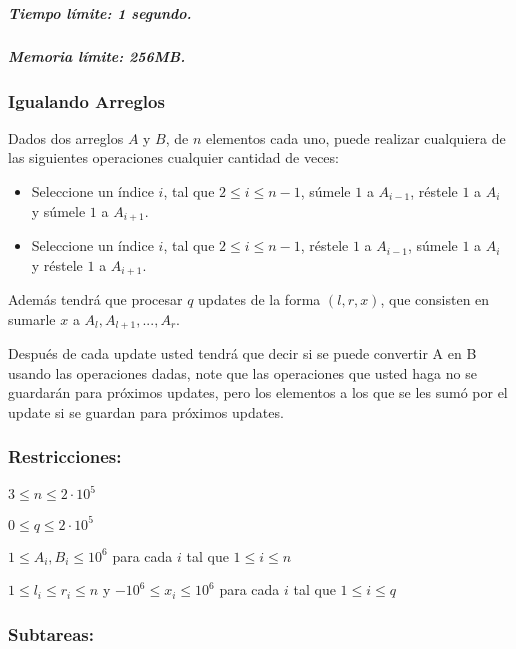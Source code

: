 \hypertarget{tiempo-luxedmite-1-segundo.}{%
\subparagraph{Tiempo límite: 1
segundo.}\label{tiempo-luxedmite-1-segundo.}}

\hypertarget{memoria-luxedmite-256mb.}{%
\subparagraph{Memoria límite: 256MB.}\label{memoria-luxedmite-256mb.}}

\hypertarget{igualando-arreglos}{%
\subsubsection{Igualando Arreglos}\label{igualando-arreglos}}

Dados dos arreglos \(A\) y \(B\), de \(n\) elementos cada uno, puede
realizar cualquiera de las siguientes operaciones cualquier cantidad de
veces:

\begin{itemize}
\item
  Seleccione un índice \(i\), tal que \(2 \leq i \leq n-1\), súmele
  \(1\) a \(A_{i-1}\), réstele \(1\) a \(A_{i}\) y súmele \(1\) a
  \(A_{i+1}\).
\item
  Seleccione un índice \(i\), tal que \(2 \leq i \leq n-1\), réstele
  \(1\) a \(A_{i-1}\), súmele \(1\) a \(A_{i}\) y réstele \(1\) a
  \(A_{i+1}\).
\end{itemize}

Además tendrá que procesar \(q\) updates de la forma \((l, r, x)\), que
consisten en sumarle \(x\) a \(A_{l}, A_{l+1}, ..., A_{r}\).

Después de cada update usted tendrá que decir si se puede convertir A en
B usando las operaciones dadas, note que las operaciones que usted haga
no se guardarán para próximos updates, pero los elementos a los que se
les sumó por el update si se guardan para próximos updates.

\hypertarget{restricciones}{%
\subsubsection{Restricciones:}\label{restricciones}}

\(3 \leq n \leq 2\cdot 10^5\)

\(0 \leq q \leq 2\cdot 10^5\)

\(1 \leq A_i, B_i \leq 10^6\) para cada \(i\) tal que
\(1 \leq i \leq n\)

\(1 \leq l_i \leq r_i \leq n\) y \(-10^6 \leq x_i \leq 10^6\) para cada
\(i\) tal que \(1 \leq i \leq q\)

\hypertarget{subtareas}{%
\subsubsection{Subtareas:}\label{subtareas}}

